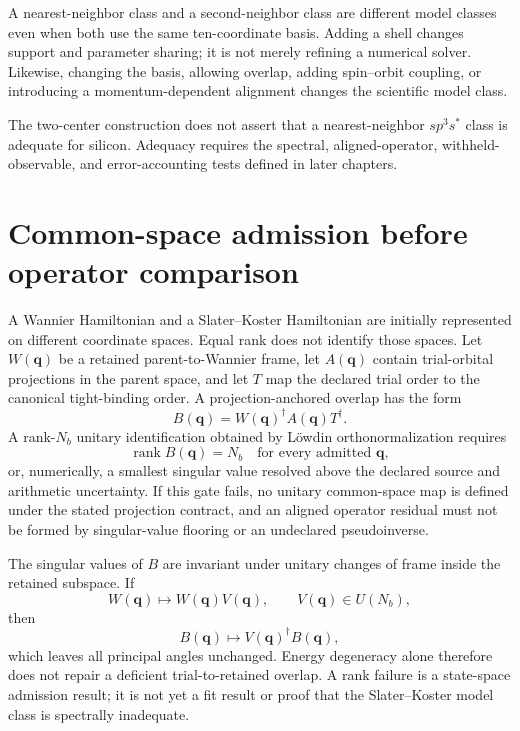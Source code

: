 A nearest-neighbor class and a second-neighbor class are different model
classes even when both use the same ten-coordinate basis. Adding a shell changes
support and parameter sharing; it is not merely refining a numerical solver.
Likewise, changing the basis, allowing overlap, adding spin--orbit coupling, or
introducing a momentum-dependent alignment changes the scientific model class.

The two-center construction does not assert that a nearest-neighbor
$sp^3s^{\ast}$ class is adequate for silicon. Adequacy requires the spectral,
aligned-operator, withheld-observable, and error-accounting tests defined in
later chapters.

\section{Common-space admission before operator comparison}

A Wannier Hamiltonian and a Slater--Koster Hamiltonian are initially represented
on different coordinate spaces. Equal rank does not identify those spaces. Let
$W(\mathbf q)$ be a retained parent-to-Wannier frame, let $A(\mathbf q)$ contain
trial-orbital projections in the parent space, and let $T$ map the declared
trial order to the canonical tight-binding order. A projection-anchored overlap
has the form
\begin{equation}
  B(\mathbf q)
  =
  W(\mathbf q)^{\dagger}A(\mathbf q)T^{\dagger}.
  \label{eq:sk-common-space-overlap}
\end{equation}
A rank-$N_b$ unitary identification obtained by L\"owdin
orthonormalization requires
\begin{equation}
  \operatorname{rank}B(\mathbf q)=N_b
  \quad\text{for every admitted }\mathbf q,
  \label{eq:sk-full-rank-gate}
\end{equation}
or, numerically, a smallest singular value resolved above the declared source
and arithmetic uncertainty. If this gate fails, no unitary common-space map is
defined under the stated projection contract, and an aligned operator residual
must not be formed by singular-value flooring or an undeclared pseudoinverse.

The singular values of $B$ are invariant under unitary changes of frame inside
the retained subspace. If
\begin{equation}
  W(\mathbf q)\longmapsto W(\mathbf q)V(\mathbf q),
  \qquad V(\mathbf q)\in U(N_b),
\end{equation}
then
\begin{equation}
  B(\mathbf q)\longmapsto V(\mathbf q)^{\dagger}B(\mathbf q),
\end{equation}
which leaves all principal angles unchanged. Energy degeneracy alone therefore
does not repair a deficient trial-to-retained overlap. A rank failure is a
state-space admission result; it is not yet a fit result or proof that the
Slater--Koster model class is spectrally inadequate.

